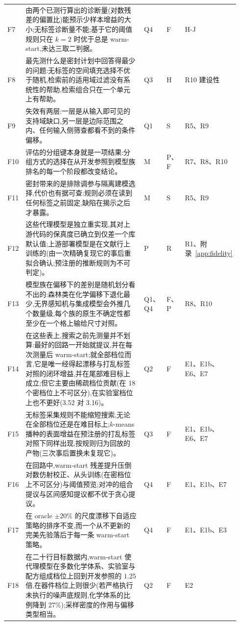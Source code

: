 \documentclass[11pt,a4paper]{ctexart}
\begin{document}
{\begin{longtable}{@{}p{0.04\linewidth}p{0.625\linewidth}p{0.075\linewidth}p{0.055\linewidth}p{0.15\linewidth}@{}}
F7 & 由两个已测行算出的诊断量(对数残差的偏置比)能预示少样本增益的大小;无标签诊断量不能;基于它的阈值规则只在 $k = 2$ 时优于总是 warm-start,未达三取二判据。 & Q4 & F & H-J \\
F8 & 最先测什么是密封计划中回答得最少的问题:无标签的空间填充选择不优于随机,检索前的适用域过滤没有系统性的帮助,检索组合只在一个单元上有帮助。 & Q3 & H & R10 建设性 \\
F9 & 失效有两层:一层是从输入即可见的支持域缺口,另一层是边际范围之内、任何输入侧筛查都看不到的条件偏移。 & Q1 & S & R5、R9 \\
F10 & 评估的分组键本身就是一项结果:分组方式的选择在从开发参照到模型族排名的每一个阶段都改变结论。 & M & P、F & R7、R8、R10 \\
F11 & 密封带来的是排除调参与隔离建模选择,代价也有据可查:规则必须在读到任何标签之前固定,缺陷在揭示之后才暴露。 & M & S & R5、R9 \\
F12 & 这些代理模型是独立重实现,其对上游代码的保真度已确立到仅差一个库默认值;上游部署模型是在文献行上训练的(由一次精确复现它的事后重拟合确认;预注册的推断规则为不可判定)。 & P & R & R1、附录~\ref{app:fidelity} \\
F13 & 模型族在偏移下的差别是随机划分看不出的:森林类在化学偏移下退化最少,无界感知机与集成模型会外推几个数量级,每个族的原生不确定性都至少在一个格上输给尺寸对照。 & Q1、Q4 & F、P & R8、R10 \\
F14 & 在这些表上,搜索之前先测量并不划算:最好的回路一开始就提议,并在每次测量后 warm-start;就全部档位而言,它是唯一经得起漂移与打乱标签对照的闭环增益,并在尾部难目标上成立;但它主要由稀疏档位贡献(在 18 个密档位上不可区分),在实验室档位上也不更好(3.52 对 3.16)。 & Q2 & F & E1、E1b、E6、E7 \\
F15 & 无标签采集规则不能缩短搜索,无论在全部档位还是在难目标上;$k$-means 播种的表面增益在预注册的打乱标签对照下同样出现,按规则归为回放的产物(三次事后置换未复现它)。 & Q3 & F & E1、E1b、E6、E7 \\
F16 & 在回路中,warm-start 残差提升压倒对数仿射校正、从头训练(在密档位上不可区分)与阈值预览;对冲的组合提议与区间感知提议都不优于贪心提议。 & Q4 & F & E1、E1b、E7 \\
F17 & 在 oracle $\pm 20\%$ 的尺度漂移下自适应策略的排序不变,而一个从不更新的完美先验落后于每一条 warm-start 策略。 & Q4 & F & E1、E1b、E3 \\
F18 & 在二十行目标数据内,warm-start 使代理模型在多数化学体系、实验室与配方组成档位上回到开发参照的 $1.25$ 倍,在器件档位上则很少(若严格执行未执行的噪声底规则,化学体系的比例降到 27\%);采样密度的作用与偏移类型相当。 & Q2 & F & E2 \\

\end{longtable}}
\end{document}
